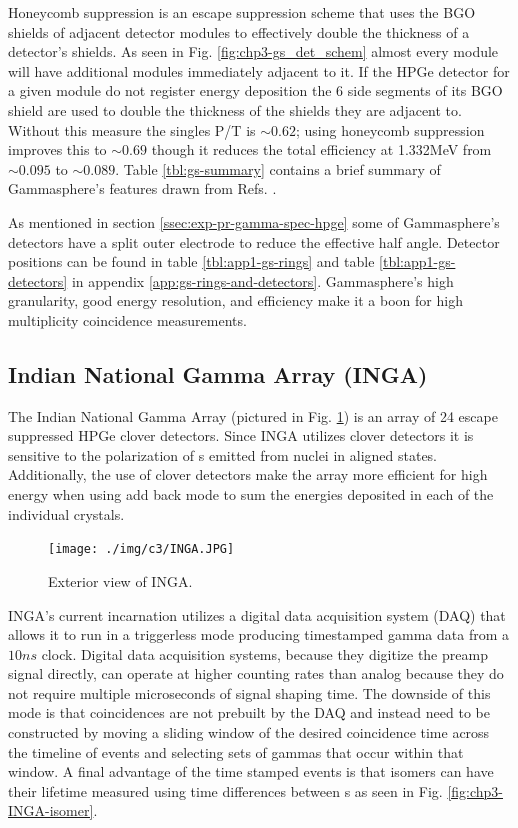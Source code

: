 Honeycomb suppression is an escape suppression scheme that uses the BGO shields of adjacent detector modules to effectively double the thickness of a detector's shields. As seen in Fig. \ref{fig:chp3-gs_det_schem} almost every module will have additional modules immediately adjacent to it. If the HPGe detector for a given module do not register energy deposition the 6 side segments of its BGO shield are used to double the thickness of the shields they are adjacent to. Without this measure the singles P/T is $\sim0.62$; using honeycomb suppression improves this to $\sim0.69$ though it reduces the total efficiency at 1.332MeV from $\sim0.095$ to $\sim0.089$\cite{TheGS}. Table \ref{tbl:gs-summary} contains a brief summary of Gammasphere's features drawn from Refs. \cite{TheGS,SimulatedResGS,GSComptonSuppression,largeArrays}.

As mentioned in section \ref{ssec:exp-pr-gamma-spec-hpge} some of Gammasphere's detectors have a split outer electrode to reduce the effective half angle. Detector positions can be found in table \ref{tbl:app1-gs-rings} and table \ref{tbl:app1-gs-detectors} in appendix \ref{app:gs-rings-and-detectors}. Gammasphere's high granularity, good energy resolution, and efficiency make it a boon for high \gr{} multiplicity coincidence measurements.

\subsection{Indian National Gamma Array (INGA)}
\label{ssec:exp-pr-gamma-spec-inga}
The Indian National Gamma Array (pictured in Fig. \ref{fig:chp3-INGA}) is an array of 24 escape suppressed HPGe clover detectors\cite{ingaAtIUAC}. Since INGA utilizes clover detectors it is sensitive to the polarization of \gr{}s emitted from nuclei in aligned states\cite{cloverDet}. Additionally, the use of clover detectors make the array more efficient for high energy \gr{} when using add back mode to sum the energies deposited in each of the individual crystals.

\begin{figure}[h!]
	\centerline{\texttt{[image: ./img/c3/INGA.JPG]}}
	\caption{Exterior view of INGA.}
	\label{fig:chp3-INGA}
\end{figure}

INGA's current incarnation utilizes a digital data acquisition system (DAQ) that allows it to run in a triggerless mode producing timestamped gamma data from a $10ns$ clock\cite{IngaDigitalDAQ}. Digital data acquisition systems, because they digitize the preamp signal directly, can operate at higher counting rates than analog because they do not require multiple microseconds of signal shaping time. The downside of this mode is that coincidences are not prebuilt by the DAQ and instead need to be constructed by moving a sliding window of the desired coincidence time across the timeline of events and selecting sets of gammas that occur within that window. A final advantage of the time stamped events is that isomers can have their lifetime measured using time differences between \gr{}s as seen in Fig. \ref{fig:chp3-INGA-isomer}.

